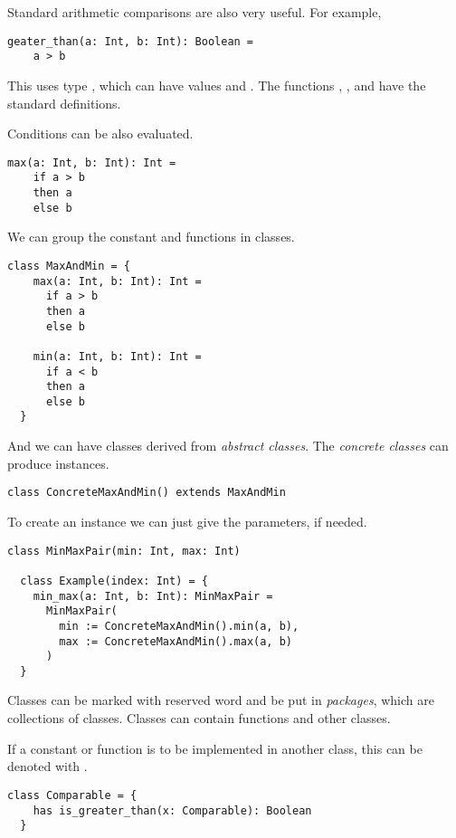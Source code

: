 Standard arithmetic comparisons are also very useful.
For example,
\begin{lstlisting}[label={lst:exampleComparison}]
  geater_than(a: Int, b: Int): Boolean =
    a > b
\end{lstlisting}

This uses type , which can have values \sfalse and \strue.
The functions \sand, \sor, and \snot have the standard definitions.

Conditions can be also evaluated.
\begin{lstlisting}[label={lst:exampleMax}]
  max(a: Int, b: Int): Int =
    if a > b
    then a
    else b
\end{lstlisting}

We can group the constant and functions in classes.

\begin{lstlisting}[label={lst:exampleClassMax}]
  class MaxAndMin = {
    max(a: Int, b: Int): Int =
      if a > b
      then a
      else b

    min(a: Int, b: Int): Int =
      if a < b
      then a
      else b
  }
\end{lstlisting}

And we can have classes derived from \emph{abstract classes}.
The \emph{concrete classes} can produce instances.

\begin{lstlisting}[label={lst:exampleClassMaxWithIndex}]
  class ConcreteMaxAndMin() extends MaxAndMin
\end{lstlisting}

To create an instance we can just give the parameters, if needed.

\begin{lstlisting}[label={lst:exampleClassMaxAnInstance}]
  class MinMaxPair(min: Int, max: Int)

  class Example(index: Int) = {
    min_max(a: Int, b: Int): MinMaxPair =
      MinMaxPair(
        min := ConcreteMaxAndMin().min(a, b),
        max := ConcreteMaxAndMin().max(a, b)
      )
  }
\end{lstlisting}

Classes can be marked with \spackage reserved word and be put in \emph{packages}, which are collections of classes.
Classes can contain functions and other classes.

If a constant or function is to be implemented in another class, this can be denoted with \shas.

\begin{lstlisting}[label={lst:exampleAbstractFunction}]
  class Comparable = {
    has is_greater_than(x: Comparable): Boolean
  }
\end{lstlisting}

